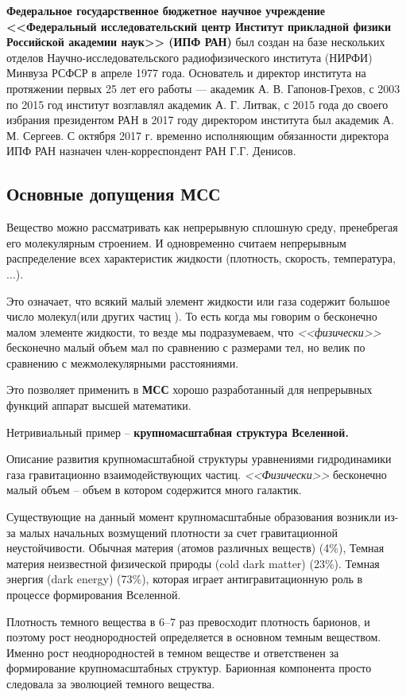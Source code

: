 \textbf{Федеральное государственное бюджетное научное учреждение <<Федеральный исследовательский центр Институт прикладной физики Российской академии наук>> (ИПФ РАН)} был создан на базе нескольких отделов Научно-исследовательского радиофизического института (НИРФИ) Минвуза РСФСР в апреле 1977 года. Основатель и директор института на протяжении первых 25 лет его работы — академик А. В. Гапонов-Грехов, с 2003 по 2015 год институт возглавлял академик А. Г. Литвак, с 2015 года до своего избрания президентом РАН в 2017 году директором института был академик А. М. Сергеев. С октября 2017 г. временно исполняющим обязанности директора ИПФ РАН назначен член-корреспондент РАН Г.Г. Денисов.

\subsection{Основные допущения \textbf{МСС}}
Вещество можно рассматривать как непрерывную сплошную среду, пренебрегая его молекулярным строением. И одновременно считаем непрерывным распределение всех характеристик жидкости (плотность, скорость, температура, $\ldots$).

Это означает, что всякий малый элемент жидкости или газа содержит большое число молекул(или других частиц ). То есть когда мы говорим о бесконечно малом элементе жидкости, то везде мы подразумеваем,  что \emph{<<физически>>} бесконечно малый объем мал по сравнению с размерами тел, но велик по сравнению с межмолекулярными расстояниями.

Это позволяет применить в \textbf{МСС} хорошо разработанный для непрерывных функций аппарат высшей математики.

Нетривиальный пример -- \textbf{крупномасштабная структура Вселенной.}

Описание развития крупномасштабной структуры  уравнениями гидродинамики газа гравитационно взаимодействующих частиц. \emph{<<Физически>>} бесконечно малый объем -- объем в котором содержится много галактик.

Существующие на данный момент крупномасштабные образования возникли из-за малых начальных возмущений плотности за счет гравитационной неустойчивости. Обычная материя (атомов различных веществ) (4\%), Темная материя неизвестной физической природы (cold dark matter) (23\%). Темная энергия (dark energy) (73\%), которая играет антигравитационную роль в процессе формирования Вселенной.

Плотность темного вещества в 6--7 раз превосходит плотность барионов, и поэтому рост неоднородностей определяется в основном темным веществом. Именно рост неоднородностей в темном веществе и ответственен за формирование крупномасштабных структур. Барионная компонента просто следовала за эволюцией темного вещества.

